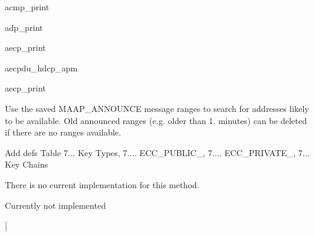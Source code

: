 
\begin{DoxyRefList}
\item[\label{todo__todo000001}%
\hypertarget{todo__todo000001}{}%
그룹 \hyperlink{group__acmp__print}{acmp\+\_\+print} ]acmp\+\_\+print  
\item[\label{todo__todo000002}%
\hypertarget{todo__todo000002}{}%
그룹 \hyperlink{group__adp__print}{adp\+\_\+print} ]adp\+\_\+print  
\item[\label{todo__todo000004}%
\hypertarget{todo__todo000004}{}%
그룹 \hyperlink{group__aecp__print}{aecp\+\_\+print} ]aecp\+\_\+print  
\item[\label{todo__todo000003}%
\hypertarget{todo__todo000003}{}%
그룹 \hyperlink{group__aecpdu__hdcp__apm}{aecpdu\+\_\+hdcp\+\_\+apm} ]aecpdu\+\_\+hdcp\+\_\+apm  
\item[\label{todo__todo000013}%
\hypertarget{todo__todo000013}{}%
그룹 \hyperlink{group__aem__print}{aem\+\_\+print} ]aecp\+\_\+print  
\item[\label{todo__todo000031}%
\hypertarget{todo__todo000031}{}%
전역 \hyperlink{maap_8c_a92dcbdd4599817c3ef20dbd7970857c9}{assign\+\_\+interval} (\hyperlink{struct_maap___client}{Maap\+\_\+\+Client} $\ast$mc, Range $\ast$range, uint64\+\_\+t attempt\+\_\+base, uint16\+\_\+t len)]Use the saved M\+A\+A\+P\+\_\+\+A\+N\+N\+O\+U\+N\+CE message ranges to search for addresses likely to be available. Old announced ranges (e.\+g. older than 1. minutes) can be deleted if there are no ranges available.  
\item[\label{todo__todo000005}%
\hypertarget{todo__todo000005}{}%
그룹 \hyperlink{group__command__acquire__entity}{command\+\_\+acquire\+\_\+entity} ]Add defs Table 7... Key Types, 7.... E\+C\+C\+\_\+\+P\+U\+B\+L\+I\+C\+\_, 7.... E\+C\+C\+\_\+\+P\+R\+I\+V\+A\+T\+E\+\_, 7... Key Chains  
\item[\label{todo__todo000020}%
\hypertarget{todo__todo000020}{}%
전역 \hyperlink{class_common_timestamper_a3b26113436dec73775d2cbc523a6e074}{Common\+Timestamper\+:\+:H\+W\+Timestamper\+\_\+get\+\_\+extderror} (char $\ast$msg) const ]There is no current implementation for this method.  
\item[\label{todo__todo000021}%
\hypertarget{todo__todo000021}{}%
전역 \hyperlink{class_ether_port_a3176217b13246c63fa4987e0ce0db149}{Ether\+Port\+:\+:add\+Foreign\+Master} (\hyperlink{class_p_t_p_message_announce}{P\+T\+P\+Message\+Announce} $\ast$msg)]Currently not implemented  
\item[\label{todo__todo000024}%

\end{DoxyRefList}
